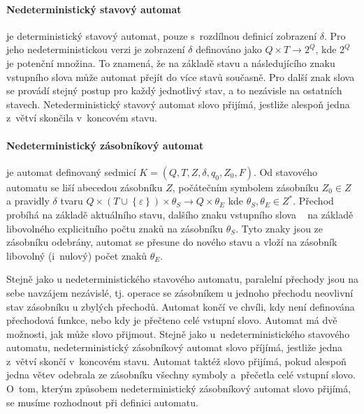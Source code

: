 			\paragraph{Nedeterministický stavový automat}
			je deterministický stavový automat, pouze s~rozdílnou definicí zobrazení $\delta$. Pro jeho nedeterministickou verzi je zobrazení $\delta$ definováno jako $Q\times T\rightarrow {2}^{Q}$, kde ${2}^{Q}$ je potenční množina. To znamená, že na základě stavu a následujícího znaku vstupního slova může automat přejít do více stavů současně. Pro další znak slova se provádí stejný postup pro každý jednotlivý stav, a to nezávisle na ostatních stavech. Netederministický stavový automat slovo přijímá, jestliže alespoň jedna z~větví skončila v~koncovém stavu.
			\paragraph{Nedeterministický zásobníkový automat}
			je automat definovaný sedmicí $K=\left(Q, T, Z, \delta, q_0, Z_0, F\right)$. Od stavového automatu se liší abecedou zásobníku $Z$, počátečním symbolem zásobníku $Z_0 \in Z$ a pravidly $\delta$ tvaru $Q \times (T \cup \left\{\varepsilon\right\}) \times \theta_S \rightarrow Q \times \theta_E$ kde $\theta_S, \theta_E \in  {Z}^{\ast}$. Přechod probíhá na základě aktuálního stavu, dalšího znaku vstupního slova ~ na základě libovolného explicitního počtu znaků na zásobníku $\theta_S$. Tyto znaky jsou ze zásobníku odebrány, automat se přesune do nového stavu a vloží na zásobník libovolný (i~nulový) počet znaků $\theta_E$.\par
			Stejně jako u nedeterministického stavového automatu, paralelní přechody jsou na sebe navzájem nezávislé, tj. operace se zásobníkem u jednoho přechodu neovlivní stav zásobníku u zbylých přechodů. Automat končí ve chvíli, kdy není definována přechodová funkce, nebo kdy je přečteno celé vstupní slovo. Automat má dvě možnosti, jak může slovo přijmout. Stejně jako u~nedeterministického stavového automatu, nedeterministický zásobníkový automat slovo příjímá, jestliže jedna z~větví skončí v~koncovém stavu. Automat taktéž slovo přijímá, pokud alespoň jedna větev odebrala ze zásobníku všechny symboly a~přečetla celé vstupní slovo. O~tom, kterým způsobem nedeterministický zásobníkový automat slovo přijímá, se musíme rozhodnout při definici automatu.
